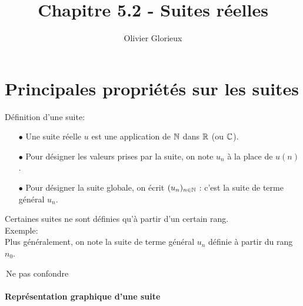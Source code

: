 \documentclass[a4paper, 11pt]{article}
\author{Olivier Glorieux}
\begin{document}
\tableofcontents
\title{Chapitre 5.2 - Suites réelles }





\section{Principales propri\'et\'es sur les suites}




\begin{defi} D\'efinition d'une suite:
\begin{itemize}
\item[$\bullet$] Une suite r\'eelle $u$ est une application de $\mathbb{N}$ dans $\mathbb{R}$  (ou $\mathbb{C}$).
\item[$\bullet$] Pour d\'esigner les valeurs prises par la suite, on note $u_n$ \`a la place de $u(n)$.
\item[$\bullet$] Pour d\'esigner la suite globale, on \'ecrit $(u_n)_{n\in \mathbb{N}}$ : c'est la suite de terme g\'en\'eral $u_n$.
\end{itemize}
\end{defi}



\begin{rem}
Certaines suites ne sont d\'efinies qu'\`a partir d'un certain rang. \\
Exemple: \dotfill \\
 Plus g\'en\'eralement, on note \dotfill la suite de terme g\'en\'eral $u_n$ d\'efinie \`a partir du rang  $n_0$.
\end{rem}

\warning \,Ne pas confondre \dotfill

\vspace{0.4cm}

\paragraph{Repr\'esentation graphique d'une suite}\vspace{0.3cm}
\end{document}
